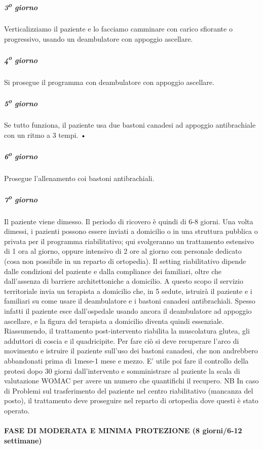 \subparagraph{3\textsuperscript{o} giorno}

Verticalizziamo il paziente e lo facciamo camminare con carico sfiorante o progressivo, usando un deambulatore con appoggio ascellare.

\subparagraph{4\textsuperscript{o} giorno}

Si prosegue il programma con deambulatore con appoggio ascellare.

\subparagraph{5\textsuperscript{o} giorno}

Se tutto funziona, il paziente usa due bastoni canadesi ad appoggio antibrachiale con un ritmo a 3 tempi. •

\subparagraph{6\textsuperscript{o} giorno}

Prosegue l'allenamento coi bastoni antibrachiali.

\subparagraph{7\textsuperscript{o} giorno}

Il paziente viene dimesso. Il periodo di ricovero è quindi di 6-8 giorni. Una volta dimessi, i pazienti possono essere inviati a domicilio o in una struttura pubblica o privata per il programma riabilitativo; qui svolgeranno un trattamento estensivo di 1 ora al giorno, oppure intensivo di 2 ore al giorno con personale dedicato (cosa non possibile in un reparto di ortopedia). Il setting riabilitativo dipende dalle condizioni del paziente e dalla compliance dei familiari, oltre che dall'assenza di barriere architettoniche a domicilio. A questo scopo il
servizio territoriale invia un terapista a domicilio che, in 5 sedute, istruirà il paziente e i familiari su come usare il deambulatore e i bastoni canadesi antibrachiali. Spesso infatti il paziente esce dall'ospedale usando ancora il deambulatore ad appoggio ascellare, e la figura del terapista a domicilio diventa quindi essenziale. Riassumendo, il trattamento post-intervento riabilita la muscolatura glutea, gli adduttori di coscia e il quadricipite. Per fare ciò si deve recuperare l'arco di movimento e istruire il paziente sull'uso dei bastoni canadesi, che non andrebbero abbandonati prima di 1mese-1 mese e mezzo.
E' utile poi fare il controllo della protesi dopo 30 giorni
dall'intervento e somministrare al paziente la scala di valutazione WOMAC per avere un numero che quantifichi il recupero. NB In caso di Problemi sul trasferimento del paziente nel centro riabilitativo (mancanza del posto), il trattamento deve proseguire nel reparto di ortopedia dove questi è stato operato.

\paragraph{FASE DI MODERATA E MINIMA PROTEZIONE (8 giorni/6-12 settimane)}

